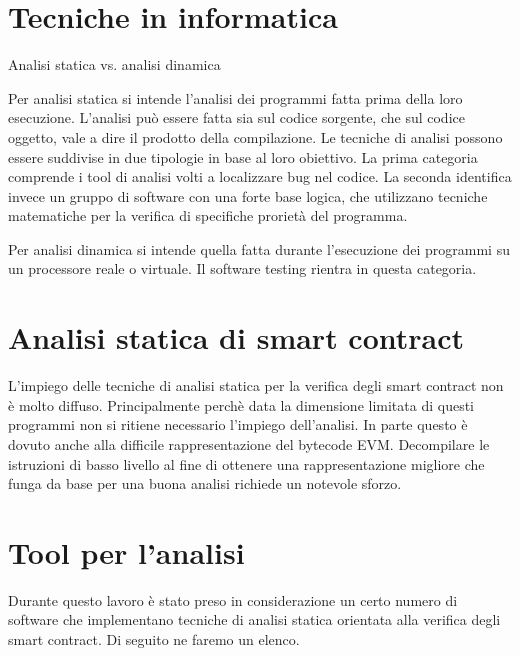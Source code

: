 


\section{Tecniche in informatica}

Analisi statica vs. analisi dinamica

Per analisi statica si intende l'analisi dei programmi fatta prima della loro esecuzione. L'analisi può essere fatta sia sul codice sorgente, che sul codice oggetto, vale a dire il prodotto della compilazione.\newline
Le tecniche di analisi possono essere suddivise in due tipologie in base al loro obiettivo. La prima categoria comprende i tool di analisi volti a localizzare bug nel codice. La seconda identifica invece un gruppo di software con una forte base logica, che utilizzano tecniche matematiche per la verifica di specifiche prorietà del programma.\newline

Per analisi dinamica si intende quella fatta durante l'esecuzione dei programmi su un processore reale o virtuale. Il software testing rientra in questa categoria. 

\section{Analisi statica di smart contract}

L'impiego delle tecniche di analisi statica per la verifica degli smart contract non è molto diffuso. Principalmente perchè data la dimensione limitata di questi programmi non si ritiene necessario l'impiego dell'analisi. 
In parte questo è dovuto anche alla difficile rappresentazione del bytecode EVM. Decompilare le istruzioni di basso livello al fine di ottenere una rappresentazione migliore che funga da base per una buona analisi richiede un notevole sforzo.

\section{Tool per l'analisi}
Durante questo lavoro è stato preso in considerazione un certo numero di software che implementano tecniche di analisi statica orientata alla verifica degli smart contract. Di seguito ne faremo un elenco.

